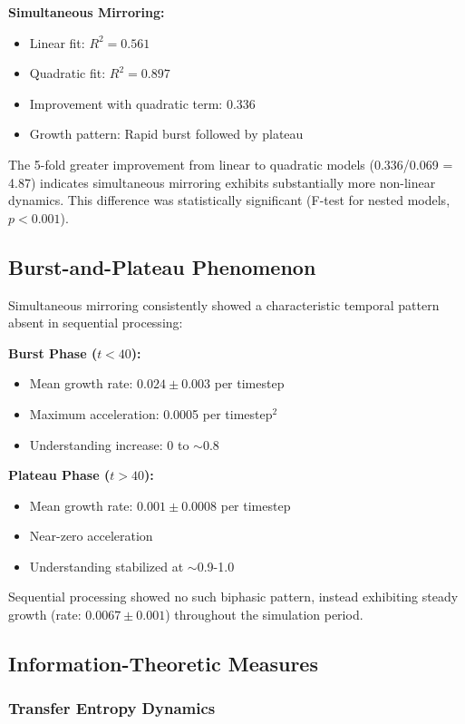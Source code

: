 \documentclass[12pt]{article}
\begin{document}
\textbf{Simultaneous Mirroring:}
\begin{itemize}
\item Linear fit: $R^2 = 0.561$
\item Quadratic fit: $R^2 = 0.897$
\item Improvement with quadratic term: 0.336
\item Growth pattern: Rapid burst followed by plateau
\end{itemize}

The 5-fold greater improvement from linear to quadratic models (0.336/0.069 = 4.87) indicates simultaneous mirroring exhibits substantially more non-linear dynamics. This difference was statistically significant (F-test for nested models, $p < 0.001$).

\subsection{Burst-and-Plateau Phenomenon}

Simultaneous mirroring consistently showed a characteristic temporal pattern absent in sequential processing:

\textbf{Burst Phase ($t < 40$):}
\begin{itemize}
\item Mean growth rate: $0.024 \pm 0.003$ per timestep
\item Maximum acceleration: 0.0005 per timestep$^2$
\item Understanding increase: 0 to $\sim$0.8
\end{itemize}

\textbf{Plateau Phase ($t > 40$):}
\begin{itemize}
\item Mean growth rate: $0.001 \pm 0.0008$ per timestep
\item Near-zero acceleration
\item Understanding stabilized at $\sim$0.9-1.0
\end{itemize}

Sequential processing showed no such biphasic pattern, instead exhibiting steady growth (rate: $0.0067 \pm 0.001$) throughout the simulation period.

\subsection{Information-Theoretic Measures}

\subsubsection{Transfer Entropy Dynamics}
\end{document}
